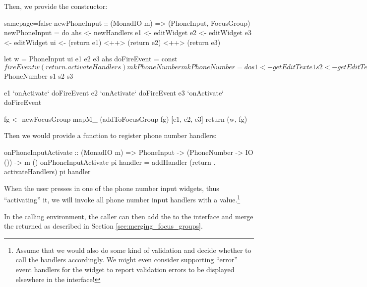 Then, we provide the constructor:

\begin{haskellcode*}{samepage=false}
 newPhoneInput :: (MonadIO m) => (PhoneInput, FocusGroup)
 newPhoneInput = do
   ahs <- newHandlers
   e1 <- editWidget
   e2 <- editWidget
   e3 <- editWidget
   ui <- (return e1) <++> (return e2) <++> (return e3)

   let w = PhoneInput ui e1 e2 e3 ahs
       doFireEvent = const $
         fireEvent w (return . activateHandlers) mkPhoneNumber

       mkPhoneNumber = do
         s1 <- getEditText e1
         s2 <- getEditText e2
         s3 <- getEditText e3
         return $ PhoneNumber s1 s2 s3

   e1 `onActivate` doFireEvent
   e2 `onActivate` doFireEvent
   e3 `onActivate` doFireEvent

   fg <- newFocusGroup
   mapM_ (addToFocusGroup fg) [e1, e2, e3]
   return (w, fg)
\end{haskellcode*}

Then we would provide a function to register phone number handlers:

\begin{haskellcode}
 onPhoneInputActivate :: (MonadIO m) => PhoneInput
                      -> (PhoneNumber -> IO ()) -> m ()
 onPhoneInputActivate pi handler =
   addHandler (return . activateHandlers) pi handler
\end{haskellcode}

When the user presses  in one of the phone number input
widgets, thus ``activating'' it, we will invoke all phone number input
handlers with a  value.\footnote{Assume that we would
  also do some kind of validation and decide whether to call the
  handlers accordingly.  We might even consider supporting ``error''
  event handlers for the widget to report validation errors to be
  displayed elsewhere in the interface!}

In the calling environment, the caller can then add the
 to the interface and merge the returned
 as described in Section
\ref{sec:merging_focus_groups}.
